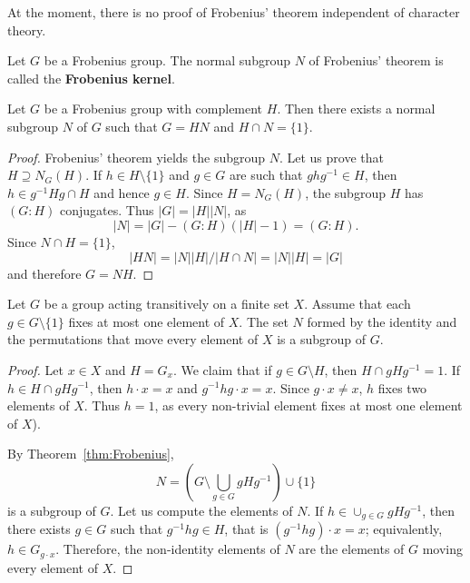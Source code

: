 At the moment, there is no proof of Frobenius' theorem independent of character theory. 

\begin{definition}
  Let $G$ be a Frobenius group. The normal subgroup 
  $N$ of Frobenius' theorem is called the \textbf{Frobenius kernel}. 
\end{definition}

\begin{corollary}
  Let $G$ be a Frobenius group with complement $H$. 
  Then there exists a normal subgroup $N$ of $G$ 
  such that 
  $G=HN$ and $H\cap N=\{1\}$.
\end{corollary}

\begin{proof}
  Frobenius' theorem yields the subgroup $N$. 
  Let us prove that $H\supseteq N_G(H)$. If $h\in
  H\setminus\{1\}$ and $g\in G$ are such that $ghg^{-1}\in H$, then $h\in
  g^{-1}Hg\cap H$ and hence $g\in H$. Since $H=N_G(H)$, the subgroup $H$
  has $(G:H)$ conjugates. Thus $|G|=|H||N|$, as 
  \[
    |N|=|G|-(G:H)(|H|-1)=(G:H).
  \]
  Since $N\cap H=\{1\}$, 
  \[
  |HN|=|N||H|/|H\cap N|=|N||H|=|G|
  \]
  and therefore $G=NH$.
\end{proof}

\begin{corollary}
    \label{cor:Frobenius_combinatorio}
    Let $G$ be a group acting transitively on a finite set $X$. 
    Assume that each $g\in G\setminus\{1\}$ fixes 
    at most one element of 
     $X$. The set $N$ formed by the identity and 
     the permutations that move every element of $X$
     is a subgroup of $G$.
\end{corollary}

\begin{proof}
  Let $x\in X$ and $H=G_x$. We claim that 
  if $g\in G\setminus H$, then $H\cap
  gHg^{-1}=1$. If $h\in H\cap gHg^{-1}$, then
  $h\cdot x=x$ and $g^{-1}hg\cdot
  x=x$. Since $g\cdot x\ne x$, $h$ fixes two elements of
  $X$. Thus 
  $h=1$, as every non-trivial element fixes at most one element of $X$). 

  By Theorem~\ref{thm:Frobenius}, 
  \[
    N=\left(G\setminus\bigcup_{g\in G}gHg^{-1}\right)\cup\{1\}
  \]
  is a subgroup of $G$. Let us compute the elements of $N$. If 
  $h\in\cup_{g\in G}gHg^{-1}$, then there exists  $g\in G$ such that $g^{-1}hg\in H$,
  that is $(g^{-1}hg)\cdot x=x$; equivalently, 
  $h\in G_{g\cdot x}$. Therefore, the 
  non-identity elements of $N$ are the elements of $G$
  moving every element of $X$.
\end{proof}

